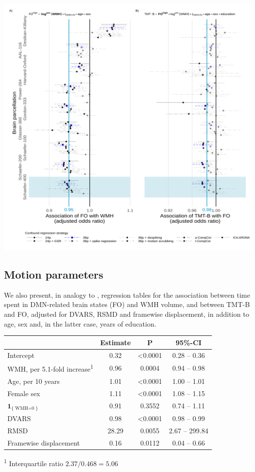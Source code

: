     \includegraphics[width=\linewidth]{./../analysis/derivatives/Figures/Fig3peri.png}

\subsection{Motion parameters}
We also present, in analogy to , regression tables for the association between time spent in DMN-related brain states (FO) and WMH volume, and between TMT-B and FO, adjusted for DVARS, RSMD and framewise displacement, in addition to age, sex and, in the latter case, years of education.

    \centering
    \setlength{\LTpost}{0mm}
    \begin{longtable}{lccc}
    \toprule
    & Estimate & P & 95\%-CI \\ 
    \midrule
    Intercept & 0.32 & <0.0001 & 0.28 -- 0.36 \\ 
    WMH, per 5.1-fold increase\textsuperscript{1} & 0.96 & 0.0004 & 0.94 -- 0.98 \\ 
    Age, per 10 years & 1.01 & <0.0001 & 1.00 -- 1.01 \\ 
    Female sex & 1.11 & <0.0001 & 1.08 -- 1.15 \\ 
    $\mathbf{1}_{\{\operatorname{WMH=0}\}}$ & 0.91 & 0.3552 & 0.74 -- 1.11 \\ 
    DVARS & 0.98 & <0.0001 & 0.98 -- 0.99 \\ 
    RMSD & 28.29 & 0.0055 & 2.67 -- 299.84 \\ 
    Framewise displacement & 0.16 & 0.0112 & 0.04 -- 0.66 \\ 
    \bottomrule
    \end{longtable}
    \textsuperscript{1} Interquartile ratio $2.37/0.468=5.06$
    

